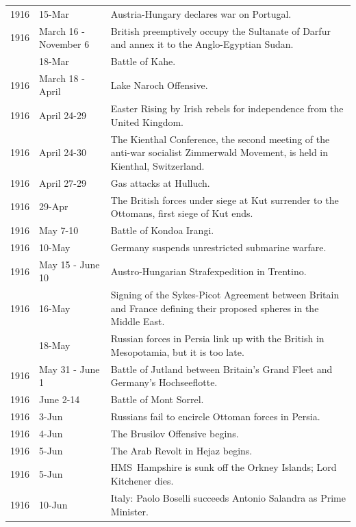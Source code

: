 \documentclass[
  openany]{book}
\begin{document}
\begin{longtable}[t]{rl>{\raggedright\arraybackslash}p{22em}}
1916 & 15-Mar & Austria-Hungary declares war on Portugal.\\
\rowcolor{gray!6}  1916 & March 16 - November 6 & British preemptively occupy the Sultanate of Darfur and annex it to the Anglo-Egyptian Sudan.\\
\addlinespace
1916 & 18-Mar & Battle of Kahe.\\
\rowcolor{gray!6}  1916 & March 18 - April & Lake Naroch Offensive.\\
1916 & April 24-29 & Easter Rising by Irish rebels for independence from the United Kingdom.\\
\rowcolor{gray!6}  1916 & April 24-30 & The Kienthal Conference, the second meeting of the anti-war socialist Zimmerwald Movement, is held in Kienthal, Switzerland.\\
1916 & April 27-29 & Gas attacks at Hulluch.\\
\addlinespace
\rowcolor{gray!6}  1916 & 29-Apr & The British forces under siege at Kut surrender to the Ottomans, first siege of Kut ends.\\
1916 & May 7-10 & Battle of Kondoa Irangi.\\
\rowcolor{gray!6}  1916 & 10-May & Germany suspends unrestricted submarine warfare.\\
1916 & May 15 - June 10 & Austro-Hungarian Strafexpedition in Trentino.\\
\rowcolor{gray!6}  1916 & 16-May & Signing of the Sykes-Picot Agreement between Britain and France defining their proposed spheres in the Middle East.\\
\addlinespace
1916 & 18-May & Russian forces in Persia link up with the British in Mesopotamia, but it is too late.\\
\rowcolor{gray!6}  1916 & May 31 - June 1 & Battle of Jutland between Britain's Grand Fleet and Germany's Hochseeflotte.\\
1916 & June 2-14 & Battle of Mont Sorrel.\\
\rowcolor{gray!6}  1916 & 3-Jun & Russians fail to encircle Ottoman forces in Persia.\\
1916 & 4-Jun & The Brusilov Offensive begins.\\
\addlinespace
\rowcolor{gray!6}  1916 & 5-Jun & The Arab Revolt in Hejaz begins.\\
1916 & 5-Jun & HMS Hampshire is sunk off the Orkney Islands; Lord Kitchener dies.\\
\rowcolor{gray!6}  1916 & 10-Jun & Italy: Paolo Boselli succeeds Antonio Salandra as Prime Minister.\\

\end{longtable}
\end{document}
